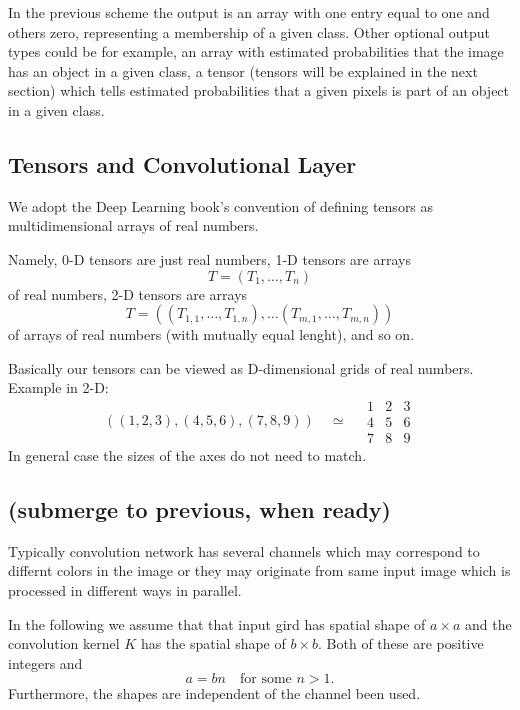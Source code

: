 \documentclass[]{article}
\begin{document}
In the previous scheme the output is an array with one entry equal to one and others
zero, representing a membership of a given class. Other optional output types could
be for example, an array with estimated probabilities that the image has an object in
a given class, a tensor (tensors will be explained in the next section) which tells
estimated probabilities that a given pixels is part of an object in a given class.

\subsection{Tensors and Convolutional Layer}
We adopt the Deep Learning book's convention of defining tensors as
multidimensional arrays of real numbers.

Namely, 0-D tensors are just real numbers, 1-D tensors are arrays
\[
T = (T_1, \ldots, T_n)
\]
of real numbers, 2-D tensors are arrays
\[
T = ((T_{1,1}, \ldots, T_{1,n}), \ldots (T_{m,1}, \ldots, T_{m,n}))
\]
of arrays of real numbers (with mutually equal lenght), and so on.

Basically our tensors can be viewed as D-dimensional grids of real numbers.
Example in 2-D:
\[
((1, 2, 3), (4, 5, 6), (7, 8, 9)) \quad \simeq \quad
\begin{array}{c|c|c}
  1 & 2 & 3 \\
  \hline
  4 & 5 & 6 \\
  \hline
  7 & 8 & 9
 \end{array}
\]
In general case the sizes of the axes do not need to match.


\subsection{(submerge to previous, when ready)}
Typically convolution network has several channels which may correspond to differnt
colors in the image or they may originate from same input image which is processed
in different ways in parallel.

In the following we assume that that input gird has spatial shape of $a \times a$
and the convolution kernel $K$ has the spatial shape of $b \times b$.
Both of these are positive integers and
\[
a = b n \quad \text{for some $n > 1$.}
\]
Furthermore, the shapes are independent of the channel been used.
\end{document}
